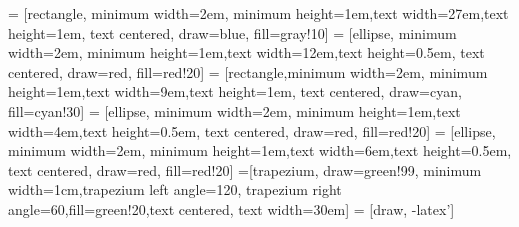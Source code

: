      = [rectangle, minimum width=2em, minimum height=1em,text width=27em,text height=1em, text centered, draw=blue, fill=gray!10]
     = [ellipse, minimum width=2em, minimum height=1em,text width=12em,text height=0.5em, text centered, draw=red, fill=red!20]
     = [rectangle,minimum width=2em, minimum height=1em,text width=9em,text height=1em, text centered, draw=cyan, fill=cyan!30]
     = [ellipse, minimum width=2em, minimum height=1em,text width=4em,text height=0.5em, text centered, draw=red, fill=red!20]
     = [ellipse, minimum width=2em, minimum height=1em,text width=6em,text height=0.5em, text centered, draw=red, fill=red!20]
    =[trapezium, draw=green!99, minimum width=1cm,trapezium left angle=120, trapezium right angle=60,fill=green!20,text centered, text width=30em]
     = [draw, -latex']

